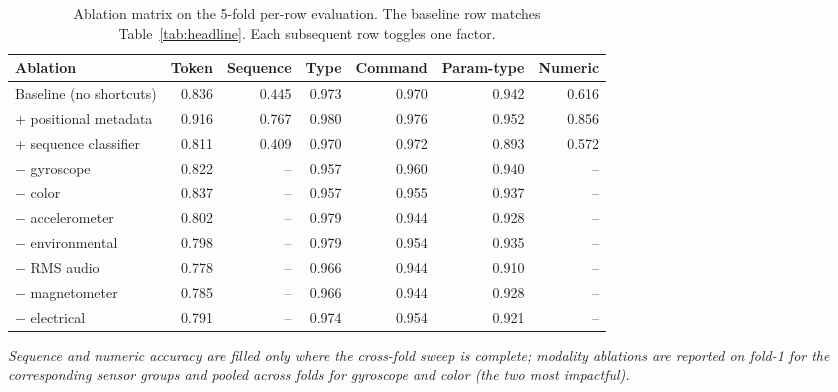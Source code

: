 \begin{table}[h]
\centering
\caption{Ablation matrix on the 5-fold per-row evaluation. The baseline row matches Table~\ref{tab:headline}. Each subsequent row toggles one factor.}
\label{tab:ablations}
\small
\begin{tabular}{l r r r r r r}
\toprule
Ablation & Token & Sequence & Type & Command & Param-type & Numeric \\
\midrule
Baseline (no shortcuts) & 0.836 & 0.445 & 0.973 & 0.970 & 0.942 & 0.616 \\
+ positional metadata    & 0.916 & 0.767 & 0.980 & 0.976 & 0.952 & 0.856 \\
+ sequence classifier    & 0.811 & 0.409 & 0.970 & 0.972 & 0.893 & 0.572 \\
$-$ gyroscope            & 0.822 & --    & 0.957 & 0.960 & 0.940 & --    \\
$-$ color                & 0.837 & --    & 0.957 & 0.955 & 0.937 & --    \\
$-$ accelerometer        & 0.802 & --    & 0.979 & 0.944 & 0.928 & --    \\
$-$ environmental        & 0.798 & --    & 0.979 & 0.954 & 0.935 & --    \\
$-$ RMS audio            & 0.778 & --    & 0.966 & 0.944 & 0.910 & --    \\
$-$ magnetometer         & 0.785 & --    & 0.966 & 0.944 & 0.928 & --    \\
$-$ electrical           & 0.791 & --    & 0.974 & 0.954 & 0.921 & --    \\
\bottomrule
\end{tabular}
\par\smallskip
\textit{Sequence and numeric accuracy are filled only where the cross-fold sweep is complete; modality ablations are reported on fold-1 for the corresponding sensor groups and pooled across folds for gyroscope and color (the two most impactful).}
\end{table}
